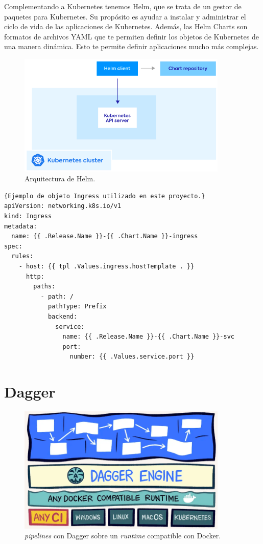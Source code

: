 Complementando a Kubernetes tenemos Helm, que se trata de un gestor de paquetes para Kubernetes. Su propósito es ayudar a instalar y administrar el ciclo de vida de las aplicaciones de Kubernetes. Además, las Helm Charts son formatos de archivos YAML que te permiten definir los objetos de Kubernetes de una manera dinámica. Esto te permite definir aplicaciones mucho más complejas.

\begin{figure}
  \centerline{\includegraphics[width=10cm]{figuras/helm}}
  \caption{Arquitectura de Helm.\cite{img:helm}}
  \label{fig:helm}
\end{figure}

\begin{lstlisting}[language=helm]{Ejemplo de objeto Ingress utilizado en este proyecto.}
apiVersion: networking.k8s.io/v1
kind: Ingress
metadata:
  name: {{ .Release.Name }}-{{ .Chart.Name }}-ingress
spec:
  rules:
    - host: {{ tpl .Values.ingress.hostTemplate . }}
      http:
        paths:
          - path: /
            pathType: Prefix
            backend:
              service:
                name: {{ .Release.Name }}-{{ .Chart.Name }}-svc
                port:
                  number: {{ .Values.service.port }}
\end{lstlisting}

\section{Dagger}

\begin{figure}
  \centerline{\includegraphics[width=10cm]{figuras/dagger}}
  \caption{\textit{pipelines} con Dagger sobre un \textit{runtime} compatible con Docker.\cite{img:dagger}}
  \label{fig:dagger}
\end{figure}


